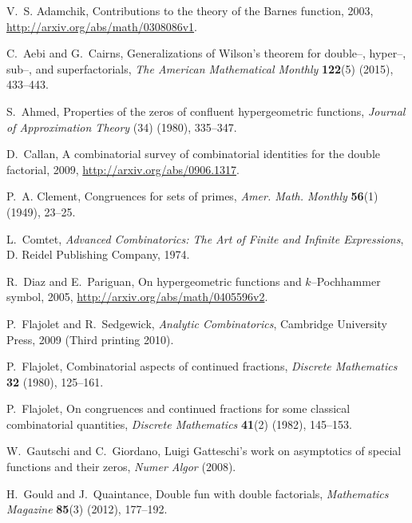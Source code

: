 \documentclass[12pt,reqno]{article}
\numberwithin{sfootnote}{section}
\numberwithin{equation}{section}
\theoremstyle{plain}
\theoremstyle{definition}
\theoremstyle{remark}
\begin{document}
\renewcommand{\refname}{References} 
\setlength{\bibsep}{0.05in} 

\begin{thebibliography}{10}

V.~S. Adamchik, Contributions to the theory of the {B}arnes function, 2003, 
\url{http://arxiv.org/abs/math/0308086v1}. 

C.~Aebi and G.~Cairns, Generalizations of {W}ilson's theorem for
  double--, hyper--, sub--, and superfactorials, {\em The American Mathematical
  Monthly} {\bf 122}(5) (2015), 433--443.

S.~Ahmed, Properties of the zeros of confluent hypergeometric functions, {\em
  Journal of Approximation Theory} (34) (1980), 335--347.

D.~Callan, A combinatorial survey of combinatorial identities for the 
double factorial, 2009, \url{http://arxiv.org/abs/0906.1317}. 

P.~A. Clement, Congruences for sets of primes, {\em Amer. Math. Monthly} {\bf
  56}(1) (1949), 23--25.

L.~Comtet, {\em Advanced Combinatorics: The Art of Finite and Infinite
  Expressions}, D. Reidel Publishing Company, 1974.

R.~Diaz and E.~Pariguan, 
On hypergeometric functions and $k$--{P}ochhammer symbol, 2005, 
\url{http://arxiv.org/abs/math/0405596v2}. 

P.~Flajolet and R.~Sedgewick, {\em Analytic Combinatorics}, Cambridge
  University Press, 2009 (Third printing 2010).

P.~Flajolet, Combinatorial aspects of continued fractions, {\em Discrete
  Mathematics} {\bf 32} (1980), 125--161.

P.~Flajolet, On congruences and continued fractions for some classical
  combinatorial quantities, {\em Discrete Mathematics} {\bf 41}(2) (1982),
  145--153.

W.~Gautschi and C.~Giordano, {L}uigi {G}atteschi's work on asymptotics of
  special functions and their zeros, {\em Numer Algor}  (2008).

H.~Gould and J.~Quaintance, Double fun with double factorials, {\em
  Mathematics Magazine} {\bf 85}(3) (2012), 177--192.


\end{thebibliography}
\end{document}
